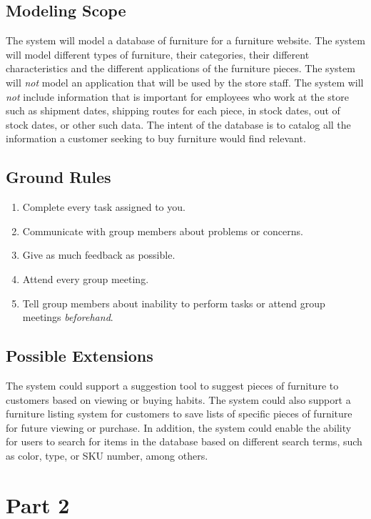 \documentclass[american,extrafontsizes,12pt,portrait,letterpaper,oneside,onecolumn,final]{memoir}
\begin{document}
\section{Modeling Scope}
The system will model a database of furniture for a furniture website.
The system will model different types of furniture, their categories, their different characteristics and the different applications of the furniture pieces.
The system will \emph{not} model an application that will be used by the store staff.
The system will \emph{not} include information that is important for employees who work at the store such as shipment dates, shipping routes for each piece, in stock dates, out of stock dates, or other such data.
The intent of the database is to catalog all the information a customer seeking to buy furniture would find relevant.

\section{Ground Rules}
\begin{samepage}
\begin{enumerate}[leftmargin=*,label={\arabic*.}]
\item Complete every task assigned to you.
\item Communicate with group members about problems or concerns.
\item Give as much feedback as possible.
\item Attend every group meeting.
\item Tell group members about inability to perform tasks or attend group meetings \emph{beforehand}.
\end{enumerate}
\end{samepage}

\section{Possible Extensions}
The system could support a suggestion tool to suggest pieces of furniture to customers based on viewing or buying habits.
The system could also support a furniture listing system for customers to save lists of specific pieces of furniture for future viewing or purchase.
In addition, the system could enable the ability for users to search for items in the database based on different search terms, such as color, type, or SKU number, among others.

\chapter{Part 2}
\end{document}
